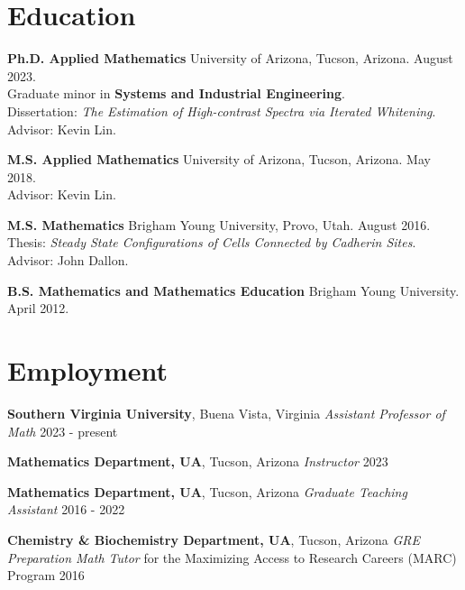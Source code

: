 \documentclass{article}
\begin{document}
\maketitle

\section*{Education}
\textbf{Ph.D. Applied Mathematics}\newline
University of Arizona, Tucson, Arizona. August 2023.
\\ Graduate minor in {\bf Systems and Industrial Engineering}. 
\\Dissertation: \emph{The Estimation of High-contrast Spectra via Iterated Whitening}. 
\\Advisor: Kevin Lin.

\textbf{M.S. Applied Mathematics}\newline
University of Arizona, Tucson, Arizona. May 2018. 
\\Advisor: Kevin Lin.

\textbf{M.S. Mathematics}\newline
Brigham Young University, Provo, Utah. August 2016. 
\\Thesis: \emph{Steady State Configurations of Cells Connected by Cadherin Sites}. 
\\Advisor: John Dallon.

\textbf{B.S. Mathematics and Mathematics Education}\newline
Brigham Young University. April 2012.

\section*{Employment}
\textbf{Southern Virginia University}, Buena Vista, Virginia\newline
\emph{Assistant Professor of Math} 2023 - present

\textbf{Mathematics Department, UA}, Tucson, Arizona\newline
\emph{Instructor} 2023

\textbf{Mathematics Department, UA}, Tucson, Arizona\newline
\emph{Graduate Teaching Assistant} 2016 - 2022

\textbf{Chemistry \& Biochemistry Department, UA}, Tucson, Arizona\newline
\emph{GRE Preparation Math Tutor} for the Maximizing Access to Research Careers (MARC) Program 2016
\end{document}
